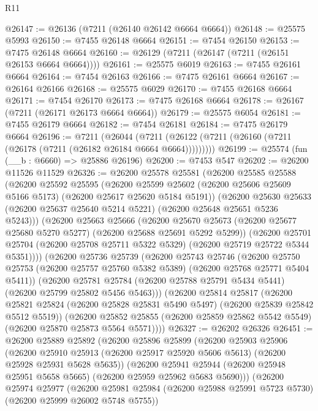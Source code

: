 \begin{lexlean}{R11}
\begin{coremodule}
@26147 := @26136 (@7211 (@26140 @26142 @6664 @6664))
@26148 := @25575 @5993
@26150 := @7455 @26148 @6664
@26151 := @7454 @26150
@26153 := @7475 @26148 @6664
@26160 := @26129 (@7211 (@26147 (@7211 (@26151 @26153 @6664 @6664))))
@26161 := @25575 @6019
@26163 := @7455 @26161 @6664
@26164 := @7454 @26163
@26166 := @7475 @26161 @6664
@26167 := @26164 @26166
@26168 := @25575 @6029
@26170 := @7455 @26168 @6664
@26171 := @7454 @26170
@26173 := @7475 @26168 @6664
@26178 := @26167 (@7211 (@26171 @26173 @6664 @6664))
@26179 := @25575 @6054
@26181 := @7455 @26179 @6664
@26182 := @7454 @26181
@26184 := @7475 @26179 @6664
@26196 := @7211
    (@26044 (@7211 (@26122 (@7211 (@26160 (@7211 (@26178 (@7211 (@26182 @26184 @6664 @6664)))))))))
@26199 := @25574 (fun (__b : @6660) => @25886 @26196)
@26200 := @7453 @547
@26202 := @26200 @11526 @11529
@26326 := @26200
    @25578
    @25581
    (@26200
      @25585
      @25588
      (@26200
        @25592
        @25595
        (@26200 @25599 @25602 (@26200 @25606 @25609 @5166 @5173) (@26200 @25617 @25620 @5184 @5191))
        (@26200
          @25630
          @25633
          (@26200 @25637 @25640 @5214 @5221)
          (@26200 @25648 @25651 @5236 @5243)))
      (@26200
        @25663
        @25666
        (@26200 @25670 @25673 (@26200 @25677 @25680 @5270 @5277) (@26200 @25688 @25691 @5292 @5299))
        (@26200
          @25701
          @25704
          (@26200 @25708 @25711 @5322 @5329)
          (@26200 @25719 @25722 @5344 @5351))))
    (@26200
      @25736
      @25739
      (@26200
        @25743
        @25746
        (@26200 @25750 @25753 (@26200 @25757 @25760 @5382 @5389) (@26200 @25768 @25771 @5404 @5411))
        (@26200
          @25781
          @25784
          (@26200 @25788 @25791 @5434 @5441)
          (@26200 @25799 @25802 @5456 @5463)))
      (@26200
        @25814
        @25817
        (@26200 @25821 @25824 (@26200 @25828 @25831 @5490 @5497) (@26200 @25839 @25842 @5512 @5519))
        (@26200
          @25852
          @25855
          (@26200 @25859 @25862 @5542 @5549)
          (@26200 @25870 @25873 @5564 @5571))))
@26327 := @26202 @26326
@26451 := @26200
    @25889
    @25892
    (@26200
      @25896
      @25899
      (@26200
        @25903
        @25906
        (@26200 @25910 @25913 (@26200 @25917 @25920 @5606 @5613) (@26200 @25928 @25931 @5628 @5635))
        (@26200
          @25941
          @25944
          (@26200 @25948 @25951 @5658 @5665)
          (@26200 @25959 @25962 @5683 @5690)))
      (@26200
        @25974
        @25977
        (@26200 @25981 @25984 (@26200 @25988 @25991 @5723 @5730) (@26200 @25999 @26002 @5748 @5755))

\end{coremodule}
\end{lexlean}
